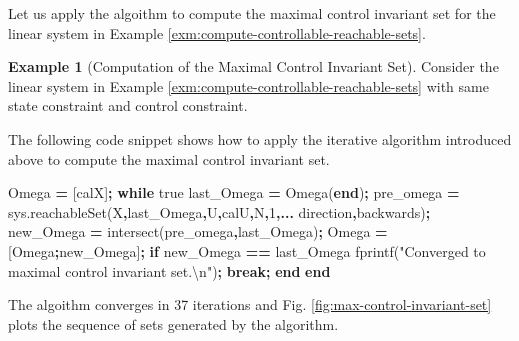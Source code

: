 \documentclass[
]{book}
\newenvironment{Shaded}{\begin{snugshade}}{\end{snugshade}}
\newcommand{\FloatTok}[1]{\textcolor[rgb]{0.00,0.00,0.81}{#1}}
\newcommand{\KeywordTok}[1]{\textcolor[rgb]{0.13,0.29,0.53}{\textbf{#1}}}
\newcommand{\NormalTok}[1]{#1}
\newcommand{\OperatorTok}[1]{\textcolor[rgb]{0.81,0.36,0.00}{\textbf{#1}}}
\newcommand{\SpecialStringTok}[1]{\textcolor[rgb]{0.31,0.60,0.02}{#1}}
\newcommand{\StringTok}[1]{\textcolor[rgb]{0.31,0.60,0.02}{#1}}
\newcommand{\VariableTok}[1]{\textcolor[rgb]{0.00,0.00,0.00}{#1}}
\theoremstyle{definition}
\theoremstyle{definition}
\newtheorem{example}{Example}[chapter]
\theoremstyle{definition}
\theoremstyle{definition}
\theoremstyle{remark}
\begin{document}
Let us apply the algoithm to compute the maximal control invariant set for the linear system in Example \ref{exm:compute-controllable-reachable-sets}.

\begin{example}[Computation of the Maximal Control Invariant Set]
\protect\hypertarget{exm:compute-control-invariant-set}{}\label{exm:compute-control-invariant-set}Consider the linear system in Example \ref{exm:compute-controllable-reachable-sets} with same state constraint and control constraint.

The following code snippet shows how to apply the iterative algorithm introduced above to compute the maximal control invariant set.

\begin{Shaded}
\begin{Highlighting}[]
\VariableTok{Omega} \OperatorTok{=}\NormalTok{ [}\VariableTok{calX}\NormalTok{]}\OperatorTok{;}
\KeywordTok{while} \VariableTok{true}
    \VariableTok{last\_Omega} \OperatorTok{=} \VariableTok{Omega}\NormalTok{(}\KeywordTok{end}\NormalTok{)}\OperatorTok{;}
    \VariableTok{pre\_omega} \OperatorTok{=} \VariableTok{sys}\NormalTok{.}\VariableTok{reachableSet}\NormalTok{(}\SpecialStringTok{\textquotesingle{}X\textquotesingle{}}\OperatorTok{,}\VariableTok{last\_Omega}\OperatorTok{,}\SpecialStringTok{\textquotesingle{}U\textquotesingle{}}\OperatorTok{,}\VariableTok{calU}\OperatorTok{,}\SpecialStringTok{\textquotesingle{}N\textquotesingle{}}\OperatorTok{,}\FloatTok{1}\OperatorTok{,...}
        \SpecialStringTok{\textquotesingle{}direction\textquotesingle{}}\OperatorTok{,}\SpecialStringTok{\textquotesingle{}backwards\textquotesingle{}}\NormalTok{)}\OperatorTok{;}
    \VariableTok{new\_Omega} \OperatorTok{=} \VariableTok{intersect}\NormalTok{(}\VariableTok{pre\_omega}\OperatorTok{,}\VariableTok{last\_Omega}\NormalTok{)}\OperatorTok{;}
    \VariableTok{Omega} \OperatorTok{=}\NormalTok{ [}\VariableTok{Omega}\OperatorTok{;}\VariableTok{new\_Omega}\NormalTok{]}\OperatorTok{;}
    \KeywordTok{if} \VariableTok{new\_Omega} \OperatorTok{==} \VariableTok{last\_Omega}
        \VariableTok{fprintf}\NormalTok{(}\StringTok{"Converged to maximal control invariant set.\textbackslash{}n"}\NormalTok{)}\OperatorTok{;}
        \KeywordTok{break}\OperatorTok{;}
    \KeywordTok{end}
\KeywordTok{end}
\end{Highlighting}
\end{Shaded}

The algoithm converges in 37 iterations and Fig. \ref{fig:max-control-invariant-set} plots the sequence of sets generated by the algorithm.


\end{example}
\end{document}

